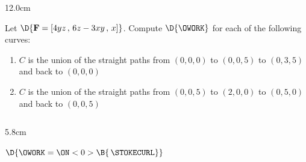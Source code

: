 \begin{frame}
\begin{columns}\begin{column}{12.0cm}
\scriptsize


Let $\D{{\bf F} = [4yz\,,\,6z-3xy\,,\, x]}$. Compute $\D{\OWORK}$ for each of the following curves:
\begin{enumerate}
	\item[a.] $C$ is the union of the straight paths from $(0,0,0)$ to $(0,0,5)$ to $(0,3,5)$ and back to $(0,0,0)$
	
	\vspace{0.2cm}
	
	\item[b.] $C$ is the union of the straight paths from $(0,0,5)$ to $(2,0,0)$ to $(0,5,0)$ and back to $(0,0,5)$
			
\end{enumerate}

\vspace{0.2cm}

\begin{columns}
\begin{column}{5.8cm}
\vspace{0.2cm}

	
	\vspace{0.3cm}
	
	
	\vspace{0.6cm}
	
	$\D{\OWORK = 
\ON<0>{\B{\,\STOKECURL}}}$

\vspace{0.2cm}

\hspace{0.9cm} 

\vspace{0.2cm}

\hspace{0.9cm} 

\vspace{0.2cm}

\hspace{0.9cm} 


\end{column}
\end{columns}
\end{column}
\end{columns}
\end{frame}
